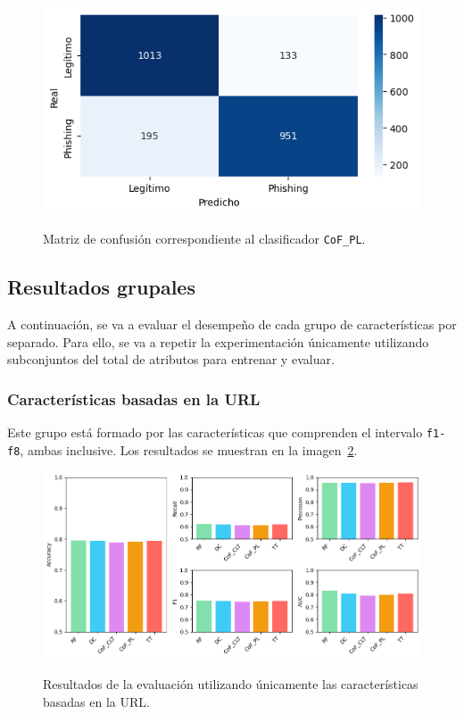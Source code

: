 \begin{figure}[h]
	\caption[\textit{Phishing}: detección (\texttt{f1-f19}, matriz de confusión \texttt{CoF\_PL})]{Matriz de confusión correspondiente al clasificador \texttt{CoF\_PL}.}
	\centering
	\includegraphics[scale=0.8]{../img/memoria/5_phishing/f1f19_cof_clt}
	\label{gr:ph-f1f19_cof_clt}
\end{figure}

\subsection{Resultados grupales}

A continuación, se va a evaluar el desempeño de cada grupo de características por separado. Para ello, se va a repetir la experimentación únicamente utilizando subconjuntos del total de atributos para entrenar y evaluar.

\subsubsection{Características basadas en la URL}

Este grupo está formado por las características que comprenden el intervalo \texttt{f1-f8}, ambas inclusive. Los resultados se muestran en la imagen~\ref{gr:ph-f1f8_small}.

\begin{figure}[h]
	\caption[\textit{Phishing}: detección (\texttt{f1-f8})]{Resultados de la evaluación utilizando únicamente las características basadas en la URL.}
	\centering
	\includegraphics[width=\textwidth]{../img/memoria/5_phishing/f1f8_big}
	\label{gr:ph-f1f8_small}
\end{figure}

